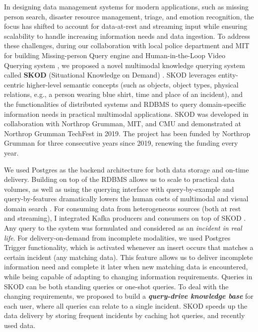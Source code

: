 %
In designing data management systems for modern applications, such as missing person search, disaster resource management, triage, and emotion recognition, the focus has shifted to account for data-at-rest and streaming input while ensuring scalability to handle increasing information needs and data ingestion. To address these challenges, 
during our collaboration with local police department and MIT for building Missing-person Query engine \cite{solaiman2021applying} and Human-in-the-Loop Video Querying system \cite{stonebraker2020surveillance}, we proposed a novel multimodal knowledge querying system called \textbf{SKOD} (Situational Knowledge on Demand) \cite{palacios2019wip, stonebraker2020surveillance}. SKOD leverages entity-centric higher-level semantic concepts
(such as objects, object types, physical relations, e.g., a person wearing blue shirt, time and place of  an incident),  
and the functionalities of distributed systems and RDBMS
to query domain-specific information needs in practical multimodal applications. SKOD was developed in collaboration with Northrop Grumman, MIT, and CMU and demonstrated at Northrop Grumman TechFest in 2019. The project has been funded by Northrop Grumman for three consecutive years since 2019, renewing the funding every year.


    We used Postgres as the backend architecture  for both data storage and on-time delivery. 
    Building on top of the RDBMS allows us to scale to practical data %
    volumes, as well as using the querying interface with query-by-example and query-by-features dramatically lowers the human costs of 
    multimodal and visual domain search \cite{stonebraker2020surveillance}.
    For consuming data from heterogeneous sources (both at rest and streaming), I integrated Kafka producers and consumers on top of SKOD \cite{palacios2019wip}. 
    Any query to the system was formulated and considered as an \textit{incident in real life}.
    For delivery-on-demand from incomplete modalities, we used Postgres Trigger functionality, which 
    is activated whenever an insert occurs that matches a certain incident (any matching data). 
    This feature allows us to deliver incomplete 
    information need %
    and complete it later when new matching data is encountered, while being capable of adapting to changing information requirements. Queries in SKOD can be both standing queries or one-shot queries. To deal with the changing requirements, we proposed to build a \textit{\textbf{query-drive knowledge base}} for each user, where all queries can relate to a single incident. SKOD speeds up the data delivery by storing frequent incidents by caching hot queries, and recently used data.


